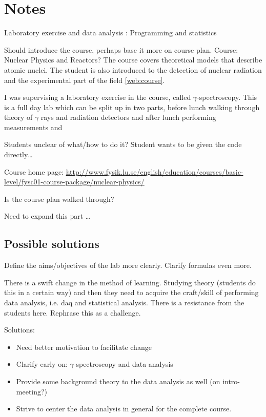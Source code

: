 \documentclass[]{article}
\begin{document}
\section{Notes}
Laboratory exercise and data analysis : Programming and statistics

Should introduce the course, perhaps base it more on course plan.
Course: Nuclear Physics and Reactors?
The course covers theoretical models that describe atomic nuclei.
The student is also introduced to the detection of nuclear radiation and the experimental part of the field \ref{web:course}.

I was supervising a laboratory exercise in the course, called $\gamma$-spectroscopy.
This is a full day lab which can be split up in two parts, before lunch walking through theory of $\gamma$ rays and radiation detectors and after lunch performing measurements and


Students unclear of what/how to do it? Student wants to be given the code directly\dots

Course home page: \url{http://www.fysik.lu.se/english/education/courses/basic-level/fysc01-course-package/nuclear-physics/}

Is the course plan walked through?

Need to expand this part \dots


\subsection{Possible solutions}
Define the aims/objectives of the lab more clearly. Clarify formulas even more.

There is a swift change in the method of learning.
Studying theory (students do this in a certain way) and then they need to acquire the craft/skill of performing data analysis, i.e. daq and statistical analysis.
There is a resistance from the students here.
Rephrase this as a challenge.

Solutions:
\begin{itemize}
  \item Need better motivation to facilitate change
  \item Clarify early on: $\gamma$-spectroscopy and data analysis
  \item Provide some background theory to the data analysis as well (on intro-meeting?)
  \item Strive to center the data analysis in general for the complete course.
\end{itemize}
\end{document}
